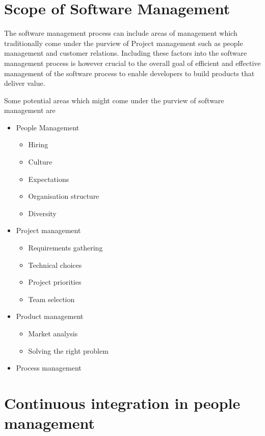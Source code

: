 \documentclass[12pt,conference]{IEEEtran}
\begin{document}
\section*{Scope of Software Management}

The software management process can include areas of management which traditionally come under the purview of Project management such as people management and customer relations. Including these factors into the software management process is however crucial to the overall goal of efficient and effective management of the software process to enable developers to build products that deliver value.

Some potential areas which might come under the purview of software management are

\begin{itemize}

\item People Management
\begin{itemize}
\item Hiring
\item Culture
\item Expectations
\item Organisation structure
\item Diversity
\end{itemize}

\item Project management
\begin{itemize}
\item Requirements gathering
\item Technical choices
\item Project priorities
\item Team selection
\end{itemize}

\item Product management
\begin{itemize}
\item Market analysis
\item Solving the right problem
\end{itemize}

\item Process management
\end{itemize}


\section*{Continuous integration in people management}
\end{document}
